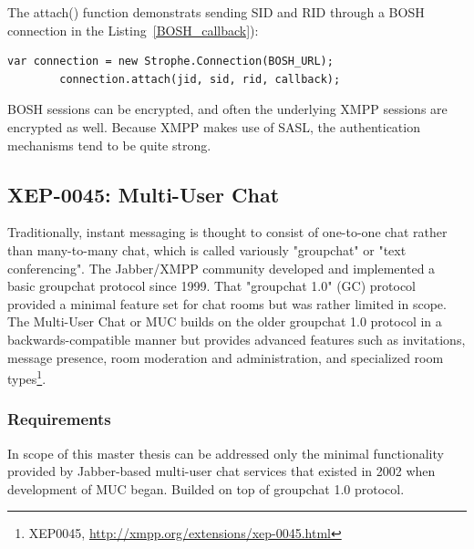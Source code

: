 The attach() function demonstrats sending SID and RID through a BOSH connection in the Listing~\ref{BOSH_callback}):
	    \begin{lstlisting}[label=BOSH_callback,caption=BOSH Callback]
		var connection = new Strophe.Connection(BOSH_URL);
        connection.attach(jid, sid, rid, callback);
	    \end{lstlisting}

BOSH sessions can be encrypted, and often the underlying XMPP sessions are encrypted as well. Because XMPP makes use of SASL, the authentication mechanisms tend to be quite strong.

\subsection{XEP-0045: Multi-User Chat}
Traditionally, instant messaging is thought to consist of one-to-one chat rather than many-to-many chat, which is called variously "groupchat" or "text conferencing". The Jabber/XMPP community developed and implemented a basic groupchat protocol since 1999. That "groupchat 1.0" (GC) protocol provided a minimal feature set for chat rooms but was rather limited in scope. The Multi-User Chat or MUC builds on the older groupchat 1.0 protocol in a backwards-compatible manner but provides advanced features such as invitations, message presence, room moderation and administration, and specialized room types\footnote{XEP0045, \url{http://xmpp.org/extensions/xep-0045.html}}.

\subsubsection{Requirements}
In scope of this master thesis can be addressed only the minimal functionality provided by Jabber-based multi-user chat services that existed in 2002 when development of MUC began. Builded on top of groupchat 1.0 protocol. 

